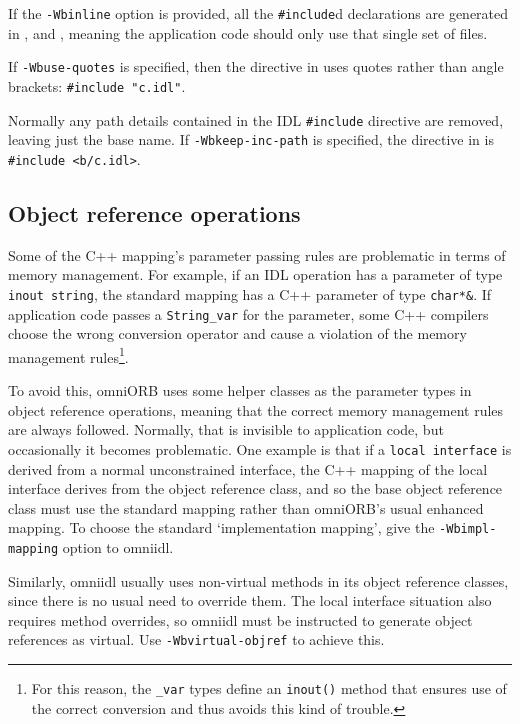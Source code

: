 \documentclass[11pt,twoside,a4paper]{book}
\newcommand{\type}[1]{\texttt{#1}}
\newcommand{\code}[1]{\texttt{#1}}
\newcommand{\op}[1]{\texttt{#1()}}
\newcommand{\cmdline}[1]{\texttt{#1}}
\newcommand{\file}{\begingroup \urlstyle{tt}\Url}
\begin{document}
If the \cmdline{-Wbinline} option is provided, all the
\code{\#include}d declarations are generated in \file{a.hh},
\file{aSK.cc} and \file{aDynSK.cc}, meaning the application code
should only use that single set of files.

If \cmdline{-Wbuse-quotes} is specified, then the directive in
\file{a.hh} uses quotes rather than angle brackets:
\code{\#include "c.idl"}.

Normally any path details contained in the IDL \code{\#include}
directive are removed, leaving just the base name. If
\cmdline{-Wbkeep-inc-path} is specified, the directive in
\file{a.hh} is \code{\#include <b/c.idl>}.



\subsection{Object reference operations}

Some of the C++ mapping's parameter passing rules are problematic in
terms of memory management. For example, if an IDL operation has a
parameter of type \type{inout string}, the standard mapping has a C++
parameter of type \type{char*\&}. If application code passes a
\type{String\_var} for the parameter, some C++ compilers choose the
wrong conversion operator and cause a violation of the memory
management rules\footnote{For this reason, the \type{\_var} types
  define an \op{inout} method that ensures use of the correct
  conversion and thus avoids this kind of trouble.}.

To avoid this, omniORB uses some helper classes as the parameter types
in object reference operations, meaning that the correct memory
management rules are always followed. Normally, that is invisible to
application code, but occasionally it becomes problematic. One example
is that if a \type{local interface} is derived from a normal
unconstrained interface, the C++ mapping of the local interface
derives from the object reference class, and so the base object
reference class must use the standard mapping rather than omniORB's
usual enhanced mapping. To choose the standard `implementation
mapping', give the \cmdline{-Wbimpl-mapping} option to omniidl.

Similarly, omniidl usually uses non-virtual methods in its object
reference classes, since there is no usual need to override them. The
local interface situation also requires method overrides, so omniidl
must be instructed to generate object references as virtual. Use
\cmdline{-Wbvirtual-objref} to achieve this.
\end{document}
